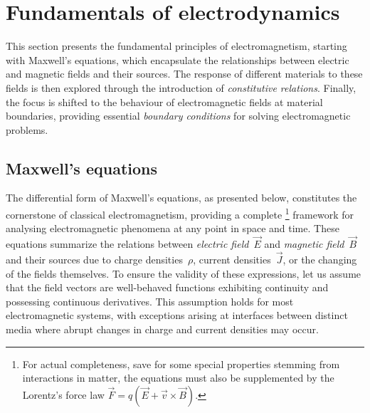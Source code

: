 \documentclass[11pt,a4paper,twoside,openany]{report}
\begin{document}
\section{Fundamentals of electrodynamics}
\label{section:fundamentals-of-electrodynamics}
This section presents the fundamental principles of electromagnetism, starting with Maxwell's equations, which encapsulate the relationships between electric and magnetic fields and their sources. The response of different materials to these fields is then explored through the introduction of \emph{constitutive relations}. Finally, the focus is shifted to the behaviour of electromagnetic fields at material boundaries, providing essential \emph{boundary conditions} for solving electromagnetic problems.

\subsection{Maxwell's equations}
\label{subsection:maxwells-equations}
The differential form of Maxwell's equations, as presented below, constitutes the cornerstone of classical electromagnetism, providing a complete%
    \footnote{For actual completeness, save for some special properties stemming from interactions in matter, the equations must also be supplemented by the Lorentz's force law $\vec F = q(\vec E + \vec v \times \vec B)$.}
framework for analysing electromagnetic phenomena at any point in space and time. These equations summarize the relations between \emph{electric field}~$\vec E$ and \emph{magnetic field}~$\vec B$ and their sources due to charge densities~$\rho$, current densities~$\vec J$, or the changing of the fields themselves. To ensure the validity of these expressions, let us assume that the field vectors are well-behaved functions exhibiting continuity and possessing continuous derivatives. This assumption holds for most electromagnetic systems, with exceptions arising at interfaces between distinct media where abrupt changes in charge and current densities may occur.
\end{document}
